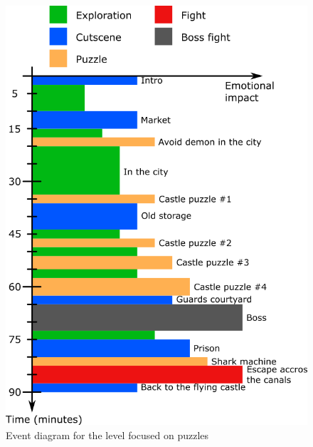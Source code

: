 \begin{figure}[H]
  \centering
  \includegraphics[width=12cm]{../Images/Diagrams/eventDiagramPuzzles}
  \caption{Event diagram for the level focused on puzzles}
\end{figure}
